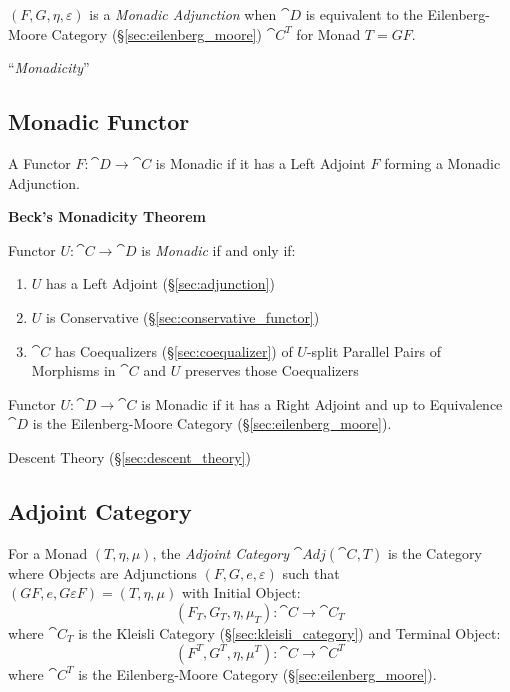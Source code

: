 $(F,G,\eta,\varepsilon)$ is a \emph{Monadic Adjunction} when
$\cat{D}$ is equivalent to the Eilenberg-Moore Category
(\S\ref{sec:eilenberg_moore}) $\cat{C}^T$ for Monad $T = GF$.

``\emph{Monadicity}''



\subsection{Monadic Functor}\label{sec:monadic_functor}

A Functor $F : \cat{D} \rightarrow \cat{C}$ is Monadic if it has
a Left Adjoint $F$ forming a Monadic Adjunction.

\textbf{Beck's Monadicity Theorem}

Functor $U : \cat{C} \rightarrow \cat{D}$ is \emph{Monadic} if
and only if:
\begin{enumerate}
  \item $U$ has a Left Adjoint (\S\ref{sec:adjunction})
  \item $U$ is Conservative (\S\ref{sec:conservative_functor})
  \item $\cat{C}$ has Coequalizers (\S\ref{sec:coequalizer}) of
    $U$-split Parallel Pairs of Morphisms in $\cat{C}$ and $U$
    preserves those Coequalizers
\end{enumerate}

Functor $U : \cat{D} \rightarrow \cat{C}$ is Monadic if it has a
Right Adjoint and up to Equivalence $\cat{D}$ is the
Eilenberg-Moore Category (\S\ref{sec:eilenberg_moore}).
\cite{lambek-scott88}

Descent Theory (\S\ref{sec:descent_theory})



\subsection{Adjoint Category}\label{sec:adjoint_category}

For a Monad $(T,\eta,\mu)$, the \emph{Adjoint Category}
$\cat{Adj}(\cat{C}, T)$ is the Category where Objects are
Adjunctions $(F,G,e,\varepsilon)$ such that $(GF,e,G \varepsilon F) =
(T,\eta,\mu)$ with Initial Object:
\[
  (F_T, G_T, \eta, \mu_T) : \cat{C} \rightarrow \cat{C}_T
\]
where $\cat{C}_T$ is the Kleisli Category
(\S\ref{sec:kleisli_category}) and Terminal Object:
\[
  (F^T, G^T, \eta, \mu^T) : \cat{C} \rightarrow \cat{C}^T
\]
where $\cat{C}^T$ is the Eilenberg-Moore Category
(\S\ref{sec:eilenberg_moore}).



